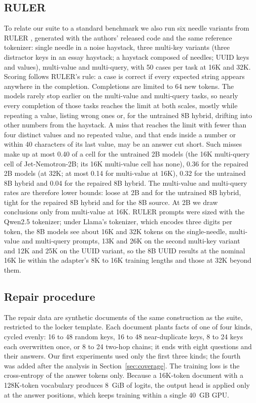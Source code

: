 \documentclass[11pt]{article}
\begin{document}
\subsection{RULER}
\label{sec:ruler}
To relate our suite to a standard benchmark we also run six needle variants from RULER \citep{ruler2024}, generated with the authors' released code and the same reference tokenizer: single needle in a noise haystack, three multi-key variants (three distractor keys in an essay haystack; a haystack composed of needles; UUID keys and values), multi-value and multi-query, with 50 cases per task at 16K and 32K. Scoring follows RULER's rule: a case is correct if every expected string appears anywhere in the completion. Completions are limited to 64 new tokens. The models rarely stop earlier on the multi-value and multi-query tasks, so nearly every completion of those tasks reaches the limit at both scales, mostly while repeating a value, listing wrong ones or, for the untrained 8B hybrid, drifting into other numbers from the haystack. A miss that reaches the limit with fewer than four distinct values and no repeated value, and that ends inside a number or within 40 characters of its last value, may be an answer cut short. Such misses make up at most 0.40 of a cell for the untrained 2B models (the 16K multi-query cell of Jet-Nemotron-2B; its 16K multi-value cell has none), 0.36 for the repaired 2B models (at 32K; at most 0.14 for multi-value at 16K), 0.32 for the untrained 8B hybrid and 0.04 for the repaired 8B hybrid. The multi-value and multi-query rates are therefore lower bounds: loose at 2B and for the untrained 8B hybrid, tight for the repaired 8B hybrid and for the 8B source. At 2B we draw conclusions only from multi-value at 16K. RULER prompts were sized with the Qwen2.5 tokenizer; under Llama's tokenizer, which encodes three digits per token, the 8B models see about 16K and 32K tokens on the single-needle, multi-value and multi-query prompts, 13K and 26K on the second multi-key variant and 12K and 25K on the UUID variant, so the 8B UUID results at the nominal 16K lie within the adapter's 8K to 16K training lengths and those at 32K beyond them.

\subsection{Repair procedure}
\label{sec:repair-setup}
The repair data are synthetic documents of the same construction as the suite, restricted to the locker template. Each document plants facts of one of four kinds, cycled evenly: 16 to 48 random keys, 16 to 48 near-duplicate keys, 8 to 24 keys each overwritten once, or 8 to 24 two-hop chains; it ends with eight questions and their answers. Our first experiments used only the first three kinds; the fourth was added after the analysis in Section~\ref{sec:coverage}. The training loss is the cross-entropy of the answer tokens only. Because a 16K-token document with a 128K-token vocabulary produces 8~GiB of logits, the output head is applied only at the answer positions, which keeps training within a single 40~GB GPU.
\end{document}
